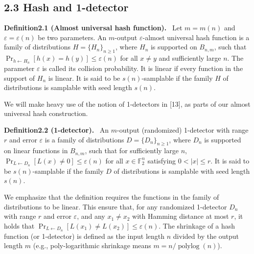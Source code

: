 \documentclass[10pt,a4paper]{article}
\newenvironment{authorclaim}[1]{\par\medskip\noindent\textbf{#1.}\ }{\par\medskip}
\begin{document}
\subsection*{2.3 Hash and 1-detector}
\begin{authorclaim}{Definition2.1 (Almost universal hash function)}
Let $m=m(n)$ and $\varepsilon=\varepsilon(n)$ be two parameters. An $m$-output $\varepsilon$-almost universal hash function is a family of distributions $H=\{H_n\}_{n\ge1}$, where $H_n$ is supported on $B_{n,m}$, such that $\Pr_{h\leftarrow H_n}[h(x)=h(y)]\le\varepsilon(n)$ for all $x\ne y$ and sufficiently large $n$. The parameter $\varepsilon$ is called its collision probability. It is linear if every function in the support of $H_n$ is linear. It is said to be $s(n)$-samplable if the family $H$ of distributions is samplable with seed length $s(n)$.
\end{authorclaim}
We will make heavy use of the notion of 1-detectors in [13], as parts of our almost universal hash construction.
\begin{authorclaim}{Definition2.2 (1-detector)}
An $m$-output (randomized) 1-detector with range $r$ and error $\varepsilon$ is a family of distributions $D=\{D_n\}_{n\ge1}$, where $D_n$ is supported on linear functions in $B_{n,m}$, such that for sufficiently large $n$, $\Pr_{L\leftarrow D_n}[L(x)\ne0]\le\varepsilon(n)$ for all $x\in\mathbb F_2^n$ satisfying $0<|x|\le r$. It is said to be $s(n)$-samplable if the family $D$ of distributions is samplable with seed length $s(n)$.
\end{authorclaim}
We emphasize that the definition requires the functions in the family of distributions to be linear. This ensure that, for any randomized 1-detector $D_n$ with range $r$ and error $\varepsilon$, and any $x_1\ne x_2$ with Hamming distance at most $r$, it holds that $\Pr_{L\leftarrow D_n}[L(x_1)\ne L(x_2)]\le\varepsilon(n)$. The shrinkage of a hash function (or 1-detector) is defined as the input length $n$ divided by the output length $m$ (e.g., poly-logarithmic shrinkage means $m=n/\operatorname{polylog}(n)$).
\end{document}
